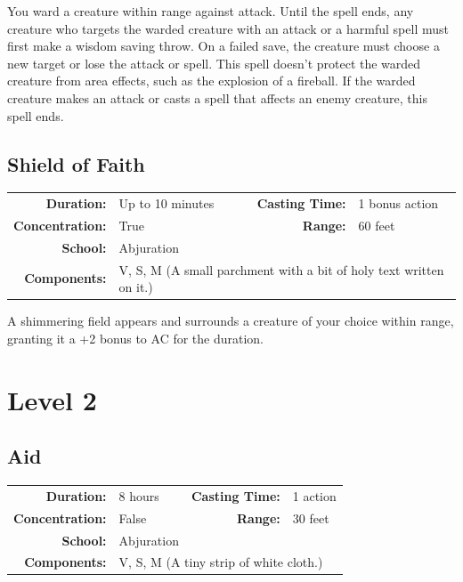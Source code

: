 \documentclass[12pt,showtrims]{memoir}
\begin{document}
\vspace{1\baselineskip}\noindent You ward a creature within range against attack. Until the spell ends, any creature who targets the warded creature with an attack or a harmful spell must first make a wisdom saving throw. On a failed save, the creature must choose a new target or lose the attack or spell. This spell doesn't protect the warded creature from area effects, such as the explosion of a fireball. If the warded creature makes an attack or casts a spell that affects an enemy creature, this spell ends.

\newpage
\section*{Shield of Faith}

{
\small\centering\vspace{-6pt}
\begin{tabular}{rlrl}
\toprule

\textbf{Duration:} & Up to 10 minutes &
\textbf{Casting Time:} & 1 bonus action \\
\textbf{Concentration:} & True &
\textbf{Range:} & 60 feet \\
\textbf{School:} & Abjuration \\
\textbf{Components:} & \multicolumn{3}{p{0.7\textwidth}}{V, S, M (A small parchment with a bit of holy text written on it.)}\\

\bottomrule
\end{tabular}
}

\vspace{1\baselineskip}\noindent A shimmering field appears and surrounds a creature of your choice within range, granting it a +2 bonus to AC for the duration.

\newpage
\chapter*{Level 2} 
\section*{Aid}

{
\small\centering\vspace{-6pt}
\begin{tabular}{rlrl}
\toprule

\textbf{Duration:} & 8 hours &
\textbf{Casting Time:} & 1 action \\
\textbf{Concentration:} & False &
\textbf{Range:} & 30 feet \\
\textbf{School:} & Abjuration \\
\textbf{Components:} & \multicolumn{3}{p{0.7\textwidth}}{V, S, M (A tiny strip of white cloth.)}\\

\bottomrule
\end{tabular}
}
\end{document}
